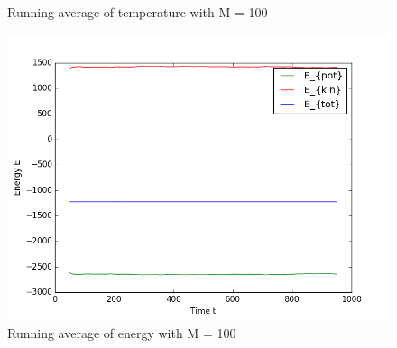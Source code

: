 \begin{figure}[h]
  \caption{Running average of temperature with M = 100}\label{fig:temp2}
\endminipage\hfill
{}
  \includegraphics[width=\linewidth]{fig/avEnergies_M100.png}
  \caption{Running average of energy with M = 100}\label{fig:energy2}
\endminipage
\end{figure}
